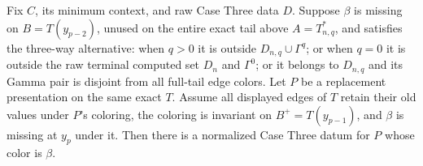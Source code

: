 \begin{lemma}
Fix $C$, its minimum context, and raw Case Three data $D$. Suppose $\beta$
is missing on $B=T(y_{p-2})$, unused on the entire exact tail above
$A=T^*_{n,q}$, and satisfies the three-way alternative: when $q>0$ it is
outside $D_{n,q}\cup\Gamma^q$; or when $q=0$ it is outside the raw
terminal computed set $D_n$ and $\Gamma^0$; or it belongs to $D_{n,q}$
and its Gamma pair is disjoint from all full-tail edge colors.
Let $P$ be a replacement presentation on the same exact $T$. Assume
all displayed edges of $T$ retain their old values under $P$'s coloring,
the coloring is invariant on $B^+=T(y_{p-1})$, and $\beta$ is missing at
$y_p$ under it. Then there is a normalized Case Three datum for $P$
whose color is $\beta$.
\end{lemma}
